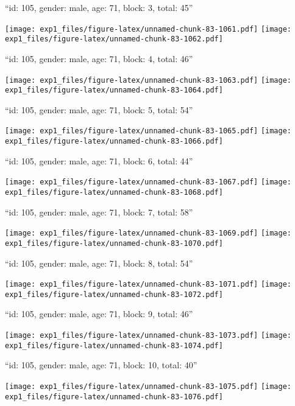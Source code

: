 \documentclass[11pt,,]{article}
\begin{document}
\newpage
[1] 

``id: 105, gender: male, age: 71, block: 3, total: 45''

\texttt{[image: exp1\_files/figure-latex/unnamed-chunk-83-1061.pdf]}
\texttt{[image: exp1\_files/figure-latex/unnamed-chunk-83-1062.pdf]}

\newpage
[1] 

``id: 105, gender: male, age: 71, block: 4, total: 46''

\texttt{[image: exp1\_files/figure-latex/unnamed-chunk-83-1063.pdf]}
\texttt{[image: exp1\_files/figure-latex/unnamed-chunk-83-1064.pdf]}

\newpage
[1] 

``id: 105, gender: male, age: 71, block: 5, total: 54''

\texttt{[image: exp1\_files/figure-latex/unnamed-chunk-83-1065.pdf]}
\texttt{[image: exp1\_files/figure-latex/unnamed-chunk-83-1066.pdf]}

\newpage
[1] 

``id: 105, gender: male, age: 71, block: 6, total: 44''

\texttt{[image: exp1\_files/figure-latex/unnamed-chunk-83-1067.pdf]}
\texttt{[image: exp1\_files/figure-latex/unnamed-chunk-83-1068.pdf]}

\newpage
[1] 

``id: 105, gender: male, age: 71, block: 7, total: 58''

\texttt{[image: exp1\_files/figure-latex/unnamed-chunk-83-1069.pdf]}
\texttt{[image: exp1\_files/figure-latex/unnamed-chunk-83-1070.pdf]}

\newpage
[1] 

``id: 105, gender: male, age: 71, block: 8, total: 54''

\texttt{[image: exp1\_files/figure-latex/unnamed-chunk-83-1071.pdf]}
\texttt{[image: exp1\_files/figure-latex/unnamed-chunk-83-1072.pdf]}

\newpage
[1] 

``id: 105, gender: male, age: 71, block: 9, total: 46''

\texttt{[image: exp1\_files/figure-latex/unnamed-chunk-83-1073.pdf]}
\texttt{[image: exp1\_files/figure-latex/unnamed-chunk-83-1074.pdf]}

\newpage
[1] 

``id: 105, gender: male, age: 71, block: 10, total: 40''

\texttt{[image: exp1\_files/figure-latex/unnamed-chunk-83-1075.pdf]}
\texttt{[image: exp1\_files/figure-latex/unnamed-chunk-83-1076.pdf]}
\end{document}
